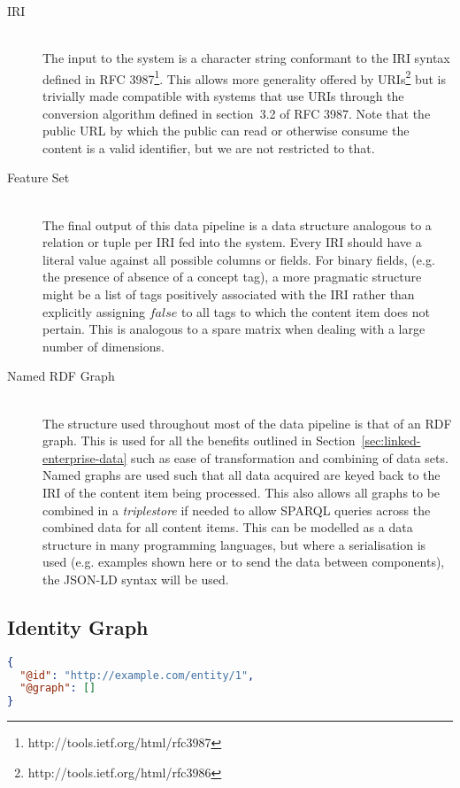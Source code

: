 \documentclass[10pt,a4paper]{report}
\begin{document}
\begin{description}

\item[IRI] \hfill \\
The input to the system is a character string conformant to the
IRI syntax defined in RFC 3987\footnote{http://tools.ietf.org/html/rfc3987}.
This allows more generality offered by
URIs\footnote{http://tools.ietf.org/html/rfc3986} but is trivially made
compatible with systems that use URIs through the conversion algorithm defined
in section~3.2 of RFC 3987. Note that the public URL by which the public can
read or otherwise consume the content is a valid identifier, but we are not
restricted to that.

\item[Feature Set] \hfill \\
The final output of this data pipeline is a data structure
analogous to a relation or tuple per IRI fed into the system. Every IRI should
have a literal value against all possible columns or fields. For binary fields,
(e.g. the presence of absence of a concept tag), a more pragmatic structure
might be a list of tags positively associated with the IRI rather than
explicitly assigning $false$ to all tags to which the content item does not
pertain. This is analogous to a spare matrix when dealing with a large number
of dimensions.

\item[Named RDF Graph] \hfill \\
The structure used throughout most of the data pipeline
is that of an RDF graph. This is used for all the benefits outlined in
Section~\ref{sec:linked-enterprise-data} such as ease of transformation and
combining of data sets. Named graphs are used such that all data acquired
are keyed back to the IRI of the content item being processed. This also allows
all graphs to be combined in a \emph{triplestore} if needed to allow SPARQL
queries across the combined data for all content items. This can be modelled as
a data structure in many programming languages, but where a serialisation is
used (e.g. examples shown here or to send the data between components), the
JSON-LD\cite{sporny2014json} syntax will be used.
\end{description}

\subsection{Identity Graph}

\begin{centering}
\begin{lstlisting}[label=lst:jsonld-identity,caption={Identity graph for a content item in JSON-LD syntax},language=json]
{
  "@id": "http://example.com/entity/1",
  "@graph": []
}
\end{lstlisting}
\end{centering}
\end{document}
